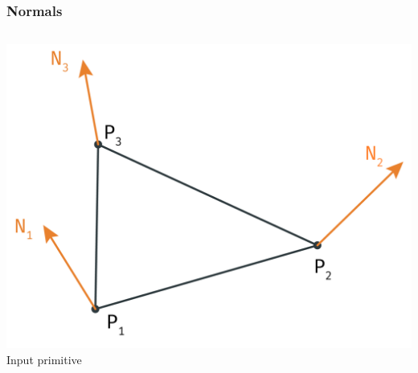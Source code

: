 	\begin{frame}\frametitle{Normals}
		\begin{columns}
			\begin{column}{0.6\textwidth}
				\begin{center}
					\includegraphics[width=\textwidth]{img/1_single/inputPrimitive_emphNormal.png}
					\small{Input primitive}
				\end{center}
			\end{column}
		\end{columns}
	\end{frame}


